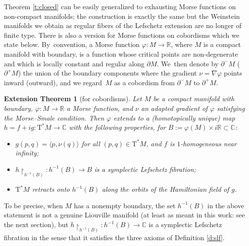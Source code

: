 \documentclass[10pt]{amsart}
\newcommand{\C}{{\mathbb C}}
\newcommand{\R}{{\mathbb R}}
\newcommand{\tu}[1]{\textup{#1}}
\newcommand{\sT}{\mathrm{T}^\ast}
\newcommand{\prg}[1]{\langle #1 \rangle}
\newcommand{\de}{\mathrel{:=}}
\newcommand{\rst}[1]{{\upharpoonright}_{\!#1}}
\let\del\partial
\let\on\colon
\theoremstyle{plain}
\newtheorem{extension-theorem}[theorem]{Extension Theorem}
\theoremstyle{definition}
\begin{document}
Theorem \ref{t:closed} can be easily generalized to exhausting Morse functions
on non-compact manifolds; the construction is exactly the same but the Weinstein
manifolds we obtain as regular fibers of the Lefschetz extension are no longer
of finite type. There is also a version for Morse functions on cobordisms which
we state below. By~convention, a Morse function $\varphi \on M \to \R$, where
$M$ is a compact manifold with boundary, is a function whose critical points are
non-degenerate and which is locally constant and regular along $\del M$. We~then
denote by $\del^-M$ (\resp $\del^+M$) the union of the boundary components
where the gradient $\nu = \nabla\varphi$ points inward (\resp outward), and we
regard~$M$ as a cobordism from $\del^-M$ to $\del^+M$.


\begin{extension-theorem}[for cobordisms] \label{t:compact}
Let $M$ be a compact manifold with boundary, $\varphi \on M \to \R$ a Morse
function, and $\nu$ an adapted gradient of $\varphi$ satisfying the Morse--Smale
condition. Then $\varphi$ extends to a \tu(homotopically unique\tu) map \hbox{$h =f+ig \on \sT M \to \C$} with the following properties, for $B \de
\varphi(M) \times i\R \subset \C$\tu:
\begin{itemize}
\item
$g(p,q) = \prg{p,\nu(q)}$ for all $(p,q) \in \sT M$, and $f$ is $1$-homogeneous
near infinity;
\item
$h \rst{h^{-1}(B)} \on h^{-1}(B) \to B$ is a symplectic Lefschetz fibration\tu;
\item
$\sT M$ retracts onto $h^{-1}(B)$ along the orbits of the Hamiltonian field of
$g$.
\end{itemize}
\end{extension-theorem}


To be precise, when $M$ has a nonempty boundary, the set $h^{-1}(B)$ in the
above statement is not a genuine Liouville manifold (at least as meant in this
work: see the next section), but $h \rst{ h^{-1}(B) } \on h^{-1}(B) \to \C$ is
a symplectic Lefschetz fibration in the sense that it satisfies the three axioms
of Definition \ref{d:slf}.
\end{document}
